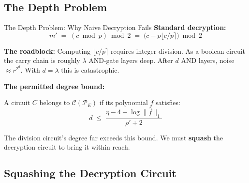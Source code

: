 \documentclass[10pt,handout]{beamer}
\begin{document}
\subsection{The Depth Problem}

\begin{frame}{The Depth Problem: Why Naive Decryption Fails}
    \textbf{Standard decryption:}
    \[
        m' \;=\; (c \bmod p) \bmod 2
        \;=\; \bigl(c - p\lfloor c/p \rceil\bigr) \bmod 2
    \]
    \pause

    \vspace{0.2cm}
    \textbf{The roadblock:} Computing $\lfloor c/p \rceil$ requires integer
    division. As a boolean circuit the carry chain is roughly $\lambda$
    AND-gate layers deep. After $d$ AND layers, noise $\approx r^{2^d}$.
    With $d = \lambda$ this is catastrophic.
    \pause

    \vspace{0.2cm}
    \textbf{The permitted degree bound:}

    A circuit $C$ belongs to $\mathcal{C}(\mathcal{P}_E)$ if its
    polynomial $f$ satisfies:
    \[
        d \;\leq\; \frac{\eta - 4 - \log \|\hat{f}\|_1}{\rho' + 2}
    \]

    \vspace{0.1cm}
    The division circuit's degree far exceeds this bound.
    We must \textbf{squash} the decryption circuit to bring it within reach.
\end{frame}

\subsection{Squashing the Decryption Circuit}
\end{document}
